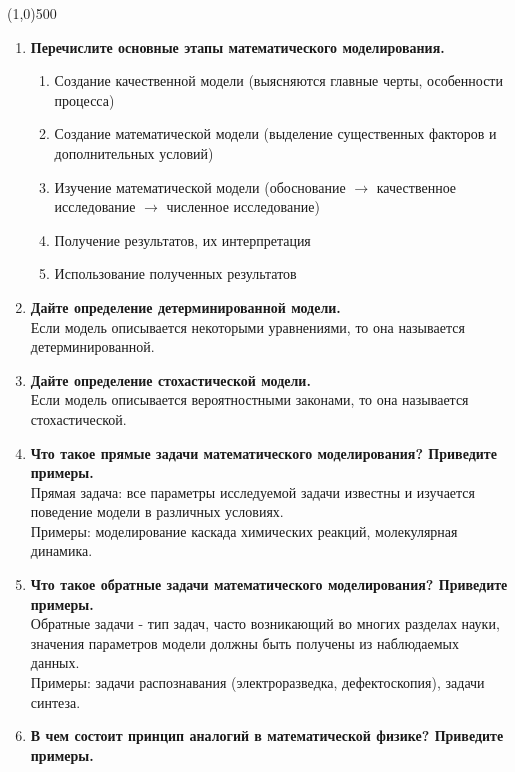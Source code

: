 


\fontsize{20}{24}
\line(1,0){500}
\fontsize{12}{15}
\begin{enumerate}[label=\textbf{\underline{\arabic*.}}]
\item \textbf{Перечислите основные этапы математического моделирования.}\\
      \begin{enumerate}
      \item Создание качественной модели (выясняются главные черты, особенности процесса)
      \item Создание математической модели (выделение существенных факторов и дополнительных условий)
      \item Изучение математической модели (обоснование $\rightarrow$ качественное исследование $\rightarrow$ численное исследование)
      \item Получение результатов, их интерпретация
      \item Использование полученных результатов
      \end{enumerate}
\item \textbf{Дайте определение детерминированной модели.}\\
      Если модель описывается некоторыми уравнениями, то она называется детерминированной.
\item \textbf{Дайте определение стохастической модели.}\\
      Если модель описывается вероятностными законами, то она называется стохастической.
\item \textbf{Что такое прямые задачи математического моделирования? Приведите примеры.}\\
      Прямая задача: все параметры исследуемой задачи известны и изучается поведение модели в различных условиях.\\
      Примеры: моделирование каскада химических реакций, молекулярная динамика.
\item \textbf{Что такое обратные задачи математического моделирования? Приведите примеры.}\\
      Обратные задачи - тип задач, часто возникающий во многих разделах науки, значения параметров модели должны быть получены из наблюдаемых данных. \Wiki\\
      Примеры: задачи распознавания (электроразведка, дефектоскопия), задачи синтеза.
\item \textbf{В чем состоит принцип аналогий в математической физике? Приведите примеры.}\\

\end{enumerate}
